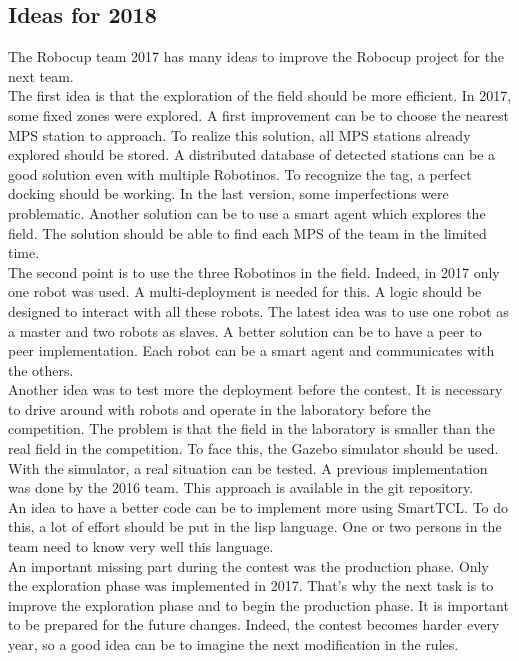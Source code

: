 \subsection{Ideas for 2018}

The Robocup team 2017 has many ideas to improve the Robocup project for the next team.\\

The first idea is that the exploration of the field should be more efficient. In 2017, some fixed zones were explored. A first improvement can be to choose the nearest MPS station to approach. To realize this solution, all MPS stations already explored should be stored. A distributed database of detected stations can be a good solution even with multiple Robotinos. To recognize the tag, a perfect docking should be working. In the last version, some imperfections were problematic. Another solution can be to use a smart agent which explores the field. The solution should be able to find each MPS of the team in the limited time.\\

The second point is to use the three Robotinos in the field. Indeed, in 2017 only one robot was used. A multi-deployment is needed for this. A logic should be designed to interact with all these robots. The latest idea was to use one robot as a master and two robots as slaves. A better solution can be to have a peer to peer implementation. Each robot can be a smart agent and communicates with the others.\\

Another idea was to test more the deployment before the contest. It is necessary to drive around with robots and operate in the laboratory before the competition. The problem is that the field in the laboratory is smaller than the real field in the competition. To face this, the Gazebo simulator should be used. With the simulator, a real situation can be tested. A previous implementation was done by the 2016 team. This approach is available in the git repository.\\

An idea to have a better code can be to implement more using SmartTCL. To do this, a lot of effort should be put in the lisp language. One or two persons in the team need to know very well this language. \\

An important missing part during the contest was the production phase. Only the exploration phase was implemented in 2017. That's why the next task is to improve the exploration phase and to begin the production phase. It is important to be prepared for the future changes. Indeed, the contest becomes harder every year, so a good idea can be to imagine the next modification in the rules.\\